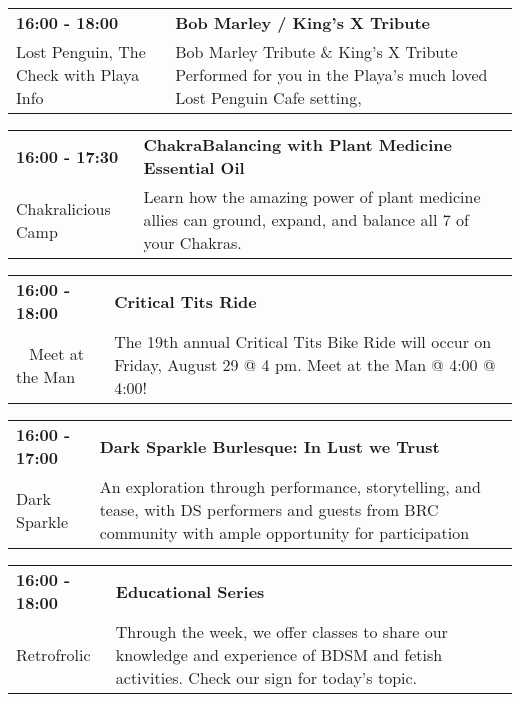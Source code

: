 \begin{tabular}{ p{1in} p{2.2in} }
    \textbf{16:00 - 18:00} & \textbf{Bob Marley / King's X Tribute} \\
    Lost Penguin, The \newline Check with Playa Info & Bob Marley Tribute \& King's X Tribute Performed for you  in the Playa's much loved Lost Penguin Cafe setting, \\
    \hline 
\end{tabular}
    
\begin{tabular}{ p{1in} p{2.2in} }
    \textbf{16:00 - 17:30} & \textbf{ChakraBalancing with Plant Medicine Essential Oil} \\
    Chakralicious Camp \newline  & Learn how the amazing power of plant medicine allies can ground, expand, and balance all 7 of your Chakras. \\
    \hline 
\end{tabular}
    
\begin{tabular}{ p{1in} p{2.2in} }
    \textbf{16:00 - 18:00} & \textbf{Critical Tits Ride} \\
    ~ \newline Meet at the Man & The 19th annual Critical Tits Bike Ride will occur on Friday, August 29 @ 4 pm. Meet at the Man @ 4:00 @ 4:00! \\
    \hline 
\end{tabular}
    
\begin{tabular}{ p{1in} p{2.2in} }
    \textbf{16:00 - 17:00} & \textbf{Dark Sparkle Burlesque: In Lust we Trust} \\
    Dark Sparkle \newline  & An exploration through performance, storytelling, and tease, with DS performers and guests from BRC community with ample opportunity for participation \\
    \hline 
\end{tabular}
    
\begin{tabular}{ p{1in} p{2.2in} }
    \textbf{16:00 - 18:00} & \textbf{Educational Series} \\
    Retrofrolic \newline  & Through the week, we offer classes to share our knowledge and experience of BDSM and fetish activities.  Check our sign for today's topic. \\
    \hline 
\end{tabular}
    
